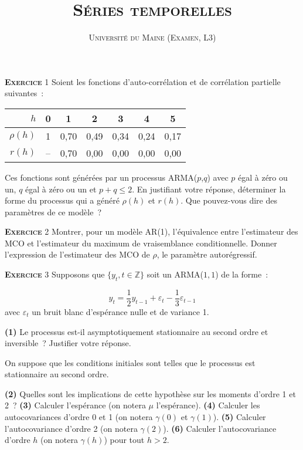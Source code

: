 \documentclass[10pt,a4paper,notitlepage,twocolumn]{article}
\newcommand{\exercice}[1]{\textsc{\textbf{Exercice}} #1}
\newcommand{\question}[1]{\textbf{(#1)}}
\begin{document}
\title{\textsc{Séries temporelles}}
\author{\textsc{Université du Maine (Examen, L3)}}
\date{}


\maketitle

\exercice{1} Soient les fonctions d'auto-corrélation et de corrélation
partielle suivantes :
\begin{table}[H]
  \centering
  \begin{tabular}{r|cccccc}
    \hline\hline
    $h$ & 0 & 1 & 2 & 3 & 4 & 5 \\\hline
    $\rho (h)$ & 1 & 0,70 & 0,49 & 0,34 & 0,24 & 0,17\\
    $r (h)$ & -- & 0,70 & 0,00 & 0,00 & 0,00 & 0,00\\
    \hline\hline
  \end{tabular}
\end{table}
\noindent Ces  fonctions sont générées par  un processus ARMA($p$,$q$)
avec $p$ égal à zéro ou un, $q$ égal  à zéro ou un et $p+q \leq 2$. En
justifiant  votre réponse,  déterminer  la forme  du  processus qui  a
généré $\rho(h)$ et $r(h)$. Que  pouvez-vous dire des paramètres de ce
modèle~?

\bigskip
\bigskip

\exercice{2}  Montrer,  pour  un  modèle  AR(1),  l'équivalence  entre
l'estimateur  des  MCO et  l'estimateur  du  maximum de  vraisemblance
conditionnelle. Donner l'expression de l'estimateur des MCO de $\rho$,
le paramètre autorégressif.

\bigskip
\bigskip

\exercice{3} Supposons que $\{y_t,t\in\mathbb Z\}$ soit un ARMA($1,1$) de la forme :

\[
y_t = \frac{1}{2}y_{t-1} + \varepsilon_t - \frac{1}{3} \varepsilon_{t-1}
\]
avec $\varepsilon_t$ un bruit blanc d'espérance nulle et de variance 1.\newline

\question{1}   Le    processus   est-il   asymptotiquement
stationnaire  au   second  ordre   et  inversible~?   Justifier  votre
réponse.\newline

On suppose  que les conditions initiales sont  telles que le
processus est stationnaire au second ordre.\newline

\question{2} Quelles sont les implications de cette hypothèse sur les
moments d'ordre 1 et 2 ? \question{3} Calculer l'espérance (on notera
$\mu$ l'espérance). \question{4} Calculer les autocovariances d'ordre
0 et 1 (on notera $\gamma(0)$ et $\gamma(1)$). \question{5} Calculer
l'autocovariance d'ordre 2 (on notera $\gamma(2)$). \question{6}
Calculer l'autocovariance d'ordre $h$ (on notera $\gamma(h)$) pour tout
$h>2$.
\end{document}
